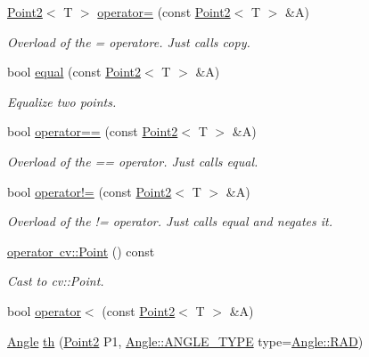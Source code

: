 \begin{DoxyCompactItemize}
\mbox{\hyperlink{class_point2}{Point2}}$<$ T $>$ \mbox{\hyperlink{class_point2_af715722f2b04def60eb23f291e31c4d8}{operator=}} (const \mbox{\hyperlink{class_point2}{Point2}}$<$ T $>$ \&A)
\begin{DoxyCompactList}\small\item\em Overload of the = operatore. Just calls {\ttfamily copy}. \end{DoxyCompactList}\item 
bool \mbox{\hyperlink{class_point2_a8ecda76875462077d1396319c8a582d5}{equal}} (const \mbox{\hyperlink{class_point2}{Point2}}$<$ T $>$ \&A)
\begin{DoxyCompactList}\small\item\em Equalize two points. \end{DoxyCompactList}\item 
bool \mbox{\hyperlink{class_point2_af58b2b05b59316580b3989b0548afade}{operator==}} (const \mbox{\hyperlink{class_point2}{Point2}}$<$ T $>$ \&A)
\begin{DoxyCompactList}\small\item\em Overload of the == operator. Just calls {\ttfamily equal}. \end{DoxyCompactList}\item 
bool \mbox{\hyperlink{class_point2_ad671e757853f5d7d5431d011d9e94b03}{operator!=}} (const \mbox{\hyperlink{class_point2}{Point2}}$<$ T $>$ \&A)
\begin{DoxyCompactList}\small\item\em Overload of the != operator. Just calls {\ttfamily equal} and negates it. \end{DoxyCompactList}\item 
\mbox{\hyperlink{class_point2_a0d3f17f7d86d02eae126aa329a20861a}{operator cv\+::\+Point}} () const
\begin{DoxyCompactList}\small\item\em Cast to cv\+::\+Point. \end{DoxyCompactList}\item 
bool \mbox{\hyperlink{class_point2_a636a84c47519a482cfce43039e981dff}{operator$<$}} (const \mbox{\hyperlink{class_point2}{Point2}}$<$ T $>$ \&A)
\item 
\mbox{\hyperlink{class_angle}{Angle}} \mbox{\hyperlink{class_point2_a4557e6d2741e1950ddfc6f854cd4a1fa}{th}} (\mbox{\hyperlink{class_point2}{Point2}} P1, \mbox{\hyperlink{class_angle_a4f7b9849ce8780bcba95ca3ee45cff77}{Angle\+::\+A\+N\+G\+L\+E\+\_\+\+T\+Y\+PE}} type=\mbox{\hyperlink{class_angle_a4f7b9849ce8780bcba95ca3ee45cff77a93ab6b68075fd7a6fe724fbde5b13c1f}{Angle\+::\+R\+AD}})
\end{DoxyCompactItemize}

